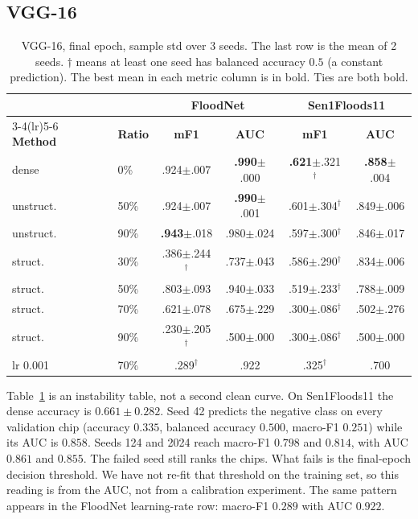 \documentclass[conference]{IEEEtran}
\begin{document}
\subsection{VGG-16}
\begin{table}[t]
\centering
\caption{VGG-16, final epoch, sample std over 3 seeds. The last row is
the mean of 2 seeds. $\dagger$ means at least one seed has balanced
accuracy $0.5$ (a constant prediction). The best mean in each metric
column is in bold. Ties are both bold.}
\label{tab:vgg}
\footnotesize
\setlength{\tabcolsep}{2.4pt}
\begin{tabular}{llcc cc}
\toprule
& & \multicolumn{2}{c}{\textbf{FloodNet}} &
\multicolumn{2}{c}{\textbf{Sen1Floods11}}\\
\cmidrule(lr){3-4}\cmidrule(lr){5-6}
\textbf{Method} & \textbf{Ratio} & \textbf{mF1} & \textbf{AUC} &
\textbf{mF1} & \textbf{AUC}\\
\midrule
dense     & 0\%  & .924$\pm$.007 & \textbf{.990}$\pm$.000 & \textbf{.621}$\pm$.321$^\dagger$ & \textbf{.858}$\pm$.004\\
unstruct. & 50\% & .924$\pm$.007 & \textbf{.990}$\pm$.001 & .601$\pm$.304$^\dagger$ & .849$\pm$.006\\
unstruct. & 90\% & \textbf{.943}$\pm$.018 & .980$\pm$.024 & .597$\pm$.300$^\dagger$ & .846$\pm$.017\\
struct.   & 30\% & .386$\pm$.244$^\dagger$ & .737$\pm$.043 & .586$\pm$.290$^\dagger$ & .834$\pm$.006\\
struct.   & 50\% & .803$\pm$.093 & .940$\pm$.033 & .519$\pm$.233$^\dagger$ & .788$\pm$.009\\
struct.   & 70\% & .621$\pm$.078 & .675$\pm$.229 & .300$\pm$.086$^\dagger$ & .502$\pm$.276\\
struct.   & 90\% & .230$\pm$.205$^\dagger$ & .500$\pm$.000 & .300$\pm$.086$^\dagger$ & .500$\pm$.000\\
\midrule
lr 0.001  & 70\% & .289$^\dagger$ & .922 & .325$^\dagger$ & .700\\
\bottomrule
\end{tabular}
\end{table}

Table~\ref{tab:vgg} is an instability table, not a second clean curve.
On Sen1Floods11 the dense accuracy is $0.661\pm0.282$. Seed 42 predicts
the negative class on every validation chip (accuracy $0.335$, balanced
accuracy $0.500$, macro-F1 $0.251$) while its AUC is $0.858$. Seeds
124 and 2024 reach macro-F1 $0.798$ and $0.814$, with AUC $0.861$ and
$0.855$. The failed seed still ranks the chips. What fails is the
final-epoch decision threshold. We have not re-fit that threshold on
the training set, so this reading is from the AUC, not from a
calibration experiment. The same pattern appears in the FloodNet
learning-rate row: macro-F1 $0.289$ with AUC $0.922$.
\end{document}
